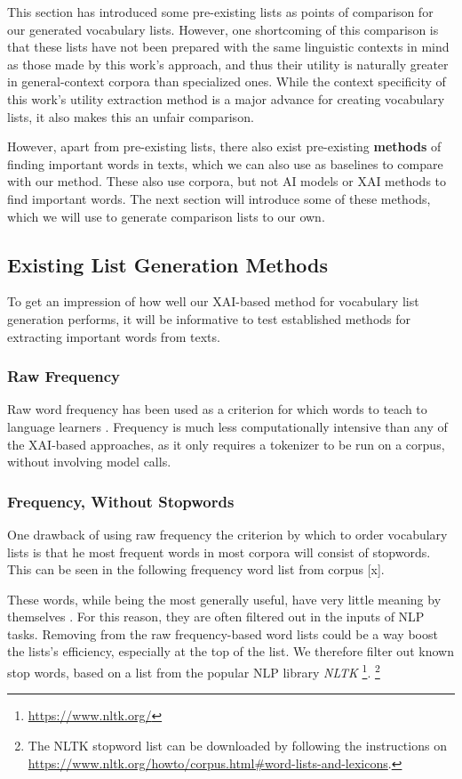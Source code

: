 This section has introduced some pre-existing lists as points of comparison for our generated vocabulary lists.
However, one shortcoming of this comparison is that these lists have not been prepared with the same linguistic contexts in mind as those made by this work's approach, and thus their utility is naturally greater in general-context corpora than specialized ones.
While the context specificity of this work's utility extraction method is a major advance for creating vocabulary lists, it also makes this an unfair comparison.

However, apart from pre-existing lists, there also exist pre-existing \textbf{methods} of finding important words in texts, which we can also use as baselines to compare with our method.
These also use corpora, but not AI models or XAI methods to find important words.
The next section will introduce some of these methods, which we will use to generate comparison lists to our own.


\subsection{Existing List Generation Methods}
To get an impression of how well our XAI-based method for vocabulary list generation performs, it will be informative to test established methods for extracting important words from texts. 

\subsubsection{Raw Frequency}

Raw word frequency has been used as a criterion for which words to teach to language learners \cite{heChoosingWordsTeach2019}.
Frequency is much less computationally intensive than any of the XAI-based approaches, as it only requires a tokenizer to be run on a corpus, without involving model calls.

\subsubsection{Frequency, Without Stopwords}
One drawback of using raw frequency the criterion by which to order vocabulary lists is that he most frequent words in most corpora will consist of stopwords.
This can be seen in the following frequency word list from corpus [x]. 

These words, while being the most generally useful, have very little meaning by themselves \cite{rajaraman2011data}.
For this reason, they are often filtered out in the inputs of NLP tasks.
Removing from the raw frequency-based word lists could be a way boost the lists's  efficiency, especially at the top of the list.
We therefore filter out known stop words, based on a list from the popular NLP library \textit{NLTK} \footnote{\url{https://www.nltk.org/}}.
\footnote{The NLTK stopword list can be downloaded by following the instructions on \url{https://www.nltk.org/howto/corpus.html\#word-lists-and-lexicons}.}


